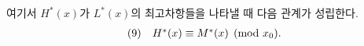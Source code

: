 
여기서 $H^*(x)$가 $L^*(x)$의 최고차항들을 나타낼 때 다음 관계가 성립한다.
\[
\begin{array}{@{}l@{\quad}c@{}}
(9)& H^*(x)\equiv M^*(x)\pmod{x_0}.
\end{array}
\]
